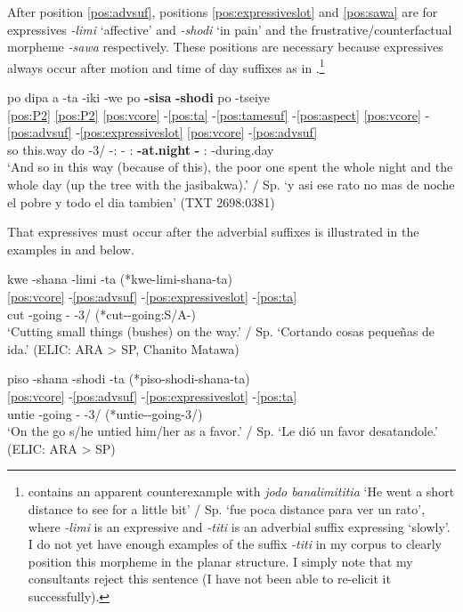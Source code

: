\documentclass[output=paper,hidelinks]{langscibook}
\begin{document}
After position \ref{pos:advsuf}, positions \ref{pos:expressiveslot} and \ref{pos:sawa} are for expressives \textit{-limi} `affective' and \textit{-shodi} `in pain' and the frustrative/counterfactual morpheme \textit{-sawa} respectively. These positions are necessary because expressives always occur after motion and time of day suffixes as in .\footnote{\citet{pitman:1980:araonasketch} contains an apparent counterexample with \textit{jodo banalimititia} `He went a short distance to see for a little bit' / Sp. `fue poca distance para ver un rato', where \textit{-limi} is an expressive and \textit{-titi} is an adverbial suffix expressing `slowly'. I do not yet have enough examples of the suffix \textit{-titi} in my corpus to clearly position this morpheme in the planar structure. I simply note that my consultants reject this sentence (I have not been able to re-elicit it successfully).}

\ea \label{ex:sisashodi}
    \glll po dipa a -ta -iki -we po \textbf{-sisa} \textbf{-shodi} po -tseiye \\
    \ref{pos:P2} \ref{pos:P2} \ref{pos:vcore} -\ref{pos:ta} -\ref{pos:tamesuf} -\ref{pos:aspect} \ref{pos:vcore} -\ref{pos:advsuf} -\ref{pos:expressiveslot} \ref{pos:vcore} -\ref{pos:advsuf} \\
    so this.way do -3\Aarg{}/\Tpl{} -\Recp{}:\Pst{} -\Limit{} \Aux{}:\Intr{} \textbf{-at.night} \textbf{-\Emot{}} \Aux{}:\Intr{} -during.day \\
    \glt `And so in this way (because of this), the poor one spent the whole night and the whole day (up the tree with the jasibakwa).' / Sp. `y asi ese rato no mas de noche el pobre y todo el dia tambien' \hfill (TXT 2698:0381)
\z 

That expressives must occur after the adverbial suffixes is illustrated in the examples in  and  below.

\ea \label{ex:shanalimi}
    \glll kwe -shana -limi -ta \hfill (*kwe-limi-shana-ta) \\
    \ref{pos:vcore} -\ref{pos:advsuf} -\ref{pos:expressiveslot} -\ref{pos:ta} \\
    cut -going -\Dim{} -3\Aarg{}/\Tpl{} \hfill (*cut-\Dim{}-going:S/A-\Third\Aarg{})   \\
    \glt `Cutting small things (bushes) on the way.' / Sp. `Cortando cosas pequeñas de ida.'  \hfill (ELIC: ARA > SP, Chanito Matawa)
\z 

\ea \label{ex:shanashodi}
    \glll piso -shana -shodi -ta \hfill (*piso-shodi-shana-ta) \\
    \ref{pos:vcore} -\ref{pos:advsuf} -\ref{pos:expressiveslot} -\ref{pos:ta} \\
    untie -going -\Emot{} -3\Aarg{}/\Tpl{} \hfill (*untie-\Aff{}-going-3\Aarg{}/\Tpl{})  \\
    \glt `On the go s/he untied him/her as a favor.' / Sp. `Le dió un favor desatandole.'  \hfill (ELIC: ARA > SP)
\z 
\end{document}
